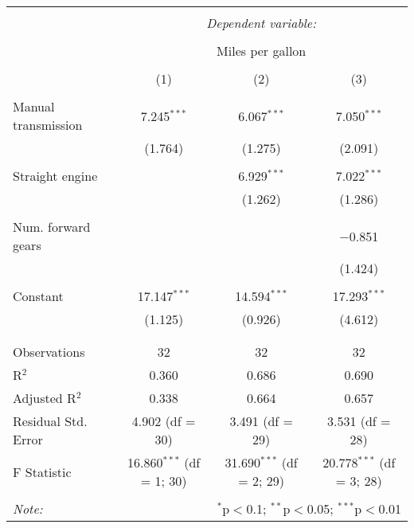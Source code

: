 
\begin{table}[!htbp] \centering 
  \caption{} 
  \label{} 
\begin{tabular}{@{\extracolsep{5pt}}lccc} 
\\[-1.8ex]\hline 
\hline \\[-1.8ex] 
 & \multicolumn{3}{c}{\textit{Dependent variable:}} \\ 
\cline{2-4} 
\\[-1.8ex] & \multicolumn{3}{c}{Miles per gallon} \\ 
\\[-1.8ex] & (1) & (2) & (3)\\ 
\hline \\[-1.8ex] 
 Manual transmission & 7.245$^{***}$ & 6.067$^{***}$ & 7.050$^{***}$ \\ 
  & (1.764) & (1.275) & (2.091) \\ 
  & & & \\ 
 Straight engine &  & 6.929$^{***}$ & 7.022$^{***}$ \\ 
  &  & (1.262) & (1.286) \\ 
  & & & \\ 
 Num. forward gears &  &  & $-$0.851 \\ 
  &  &  & (1.424) \\ 
  & & & \\ 
 Constant & 17.147$^{***}$ & 14.594$^{***}$ & 17.293$^{***}$ \\ 
  & (1.125) & (0.926) & (4.612) \\ 
  & & & \\ 
\hline \\[-1.8ex] 
Observations & 32 & 32 & 32 \\ 
R$^{2}$ & 0.360 & 0.686 & 0.690 \\ 
Adjusted R$^{2}$ & 0.338 & 0.664 & 0.657 \\ 
Residual Std. Error & 4.902 (df = 30) & 3.491 (df = 29) & 3.531 (df = 28) \\ 
F Statistic & 16.860$^{***}$ (df = 1; 30) & 31.690$^{***}$ (df = 2; 29) & 20.778$^{***}$ (df = 3; 28) \\ 
\hline 
\hline \\[-1.8ex] 
\textit{Note:}  & \multicolumn{3}{r}{$^{*}$p$<$0.1; $^{**}$p$<$0.05; $^{***}$p$<$0.01} \\ 
\end{tabular} 
\end{table} 
